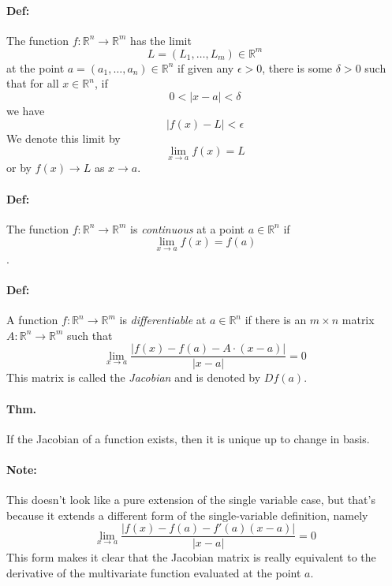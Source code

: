 \documentclass[10pt,a4paper]{article}
\begin{document}
\paragraph{Def:} The function $f: \mathbb{R}^n \to \mathbb{R}^m$ has the limit
$$ L = (L_1, \dots,L_m) \in \mathbb{R}^m$$
at the point $a = (a_1, \dots, a_n) \in \mathbb{R}^n$ if given any $\epsilon >0$, there is some $\delta > 0$ such that for all $x \in \mathbb{R}^n$, if
$$0 < |x-a| < \delta$$
we have
$$|f(x)-L| < \epsilon$$
We denote this limit by
$$\lim_{x \to a} f(x) = L$$
or by $f(x) \to L$ as $x \to a$.

\paragraph{Def:} The function $f: \mathbb{R}^n \to \mathbb{R}^m$ is \textit{continuous} at a point $a \in \mathbb{R}^n$ if $$\lim_{x \to a}  f(x) = f(a)$$.

\paragraph{Def:} A function $f: \mathbb{R}^n \to \mathbb{R}^m$ is \textit{differentiable} at $a \in \mathbb{R}^n$ if there is an $m \times n$ matrix $A: \mathbb{R}^n \to \mathbb{R}^m$ such that
$$\lim_{x \to a} \frac{|f(x)-f(a)-A\cdot(x-a)|}{|x-a|}  = 0$$
This matrix is called the \textit{Jacobian} and is denoted by $Df(a)$.

\paragraph{Thm.} If the Jacobian of a function exists, then it is unique up to change in basis.

\paragraph{Note:} This doesn't look like a pure extension of the single variable case, but that's because it extends a different form of the single-variable definition, namely
$$\lim_{x \to a} \frac{|f(x)-f(a)-f'(a)(x-a)|}{|x-a|}  = 0$$
This form makes it clear that the Jacobian matrix is really equivalent to the derivative of the multivariate function evaluated at the point $a$.
\end{document}
